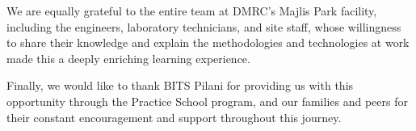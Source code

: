 \documentclass{book}
\begin{document}
\par\noindent
We are equally grateful to the entire team at DMRC's Majlis Park facility, including the engineers, laboratory technicians, and site staff, whose willingness to share their knowledge and explain the methodologies and technologies at work made this a deeply enriching learning experience.

\par\noindent
Finally, we would like to thank BITS Pilani for providing us with this opportunity through the Practice School program, and our families and peers for their constant encouragement and support throughout this journey.

\vfill
\par{}
\tableofcontents




\end{document}
